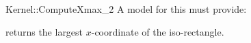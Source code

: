 \begin{ccRefFunctionObjectConcept}{Kernel::ComputeXmax_2}
A model for this must provide:


       {returns the largest $x$-coordinate of the iso-rectangle.}


\ccRefines
{}



\end{ccRefFunctionObjectConcept}
